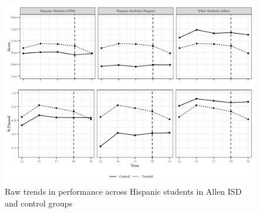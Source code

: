 \documentclass[hidelinks,twoside]{article}
\begin{document}
\begin{figure}[!ht]
\caption{{Raw trends in performance across Hispanic students in Allen ISD and control groups}}
\centerline{\includegraphics[scale=0.9]{did_trends_combined.png}}
\label{fig:performancetrend}
\end{figure}
\end{document}
